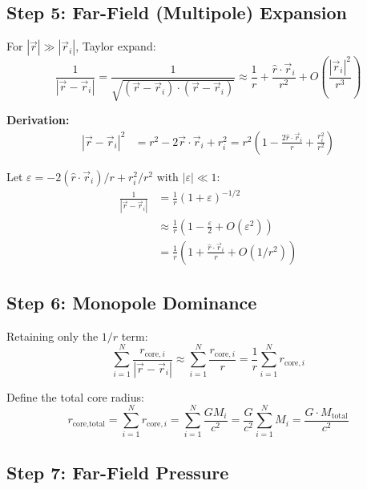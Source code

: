 \documentclass[12pt,a4paper,openany]{book}
\theoremstyle{definition}
\theoremstyle{plain}
\theoremstyle{remark}
\begin{document}
\subsection{Step 5: Far-Field (Multipole) Expansion}

For $|\vec{r}| \gg |\vec{r}_i|$, Taylor expand:
\begin{equation}
\frac{1}{|\vec{r} - \vec{r}_i|} = \frac{1}{\sqrt{(\vec{r} - \vec{r}_i)\cdot(\vec{r} - \vec{r}_i)}} \approx \frac{1}{r} + \frac{\hat{r} \cdot \vec{r}_i}{r^2} + O\left(\frac{|\vec{r}_i|^2}{r^3}\right)
\label{eq:multipole}
\end{equation}

\textbf{Derivation:}
\begin{align}
|\vec{r} - \vec{r}_i|^2 &= r^2 - 2\vec{r}\cdot\vec{r}_i + r_i^2 = r^2\left(1 - \frac{2\hat{r}\cdot\vec{r}_i}{r} + \frac{r_i^2}{r^2}\right)
\end{align}

Let $\varepsilon = -2(\hat{r}\cdot\vec{r}_i)/r + r_i^2/r^2$ with $|\varepsilon| \ll 1$:
\begin{align}
\frac{1}{|\vec{r} - \vec{r}_i|} &= \frac{1}{r}(1 + \varepsilon)^{-1/2} \\
&\approx \frac{1}{r}\left(1 - \frac{\varepsilon}{2} + O(\varepsilon^2)\right) \\
&= \frac{1}{r}\left(1 + \frac{\hat{r}\cdot\vec{r}_i}{r} + O(1/r^2)\right)
\end{align}

\subsection{Step 6: Monopole Dominance}

Retaining only the $1/r$ term:
\begin{equation}
\sum_{i=1}^{N}\frac{r_{\text{core},i}}{|\vec{r} - \vec{r}_i|} \approx \sum_{i=1}^{N}\frac{r_{\text{core},i}}{r} = \frac{1}{r}\sum_{i=1}^{N} r_{\text{core},i}
\label{eq:monopole}
\end{equation}

Define the total core radius:
\begin{equation}
r_{\text{core,total}} = \sum_{i=1}^{N} r_{\text{core},i} = \sum_{i=1}^{N} \frac{GM_i}{c^2} = \frac{G}{c^2}\sum_{i=1}^{N} M_i = \frac{G \cdot M_{\text{total}}}{c^2}
\label{eq:rcore_total}
\end{equation}

\subsection{Step 7: Far-Field Pressure}
\end{document}
